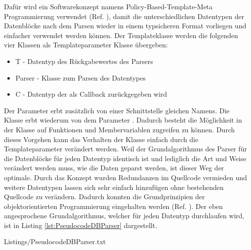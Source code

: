 Daf{\"u}r wird ein Softwarekonzept namens Policy-Based-Template-Meta Programmierung
verwendet (Ref. \cite{Alexandrescu:2001:MCD:377789}), damit die unterschiedlichen Datentypen der Datenbl{\"o}cke nach dem Parsen wieder in einem typsicheren Format vorliegen und
einfacher verwendet werden k{\"o}nnen.
Der Templateklasse werden die folgenden vier Klassen als Templateparameter
Klasse {\"u}bergeben:

\begin{itemize}
\item T - Datentyp des R{\"u}ckgabewertes des Parsers
\item Parser - Klasse zum Parsen des Datentypes
\item C - Datentyp der als Callback zur{\"u}ckgegeben wird
\end{itemize}

Der Parameter  erbt zus{\"a}tzlich von einer
Schnittstelle gleichen Namens. Die Klasse  erbt
wiederum von dem Parameter .
Dadurch besteht die M{\"o}glichkeit in der Klasse auf Funktionen und
Membervariablen zugreifen zu k{\"o}nnen.
Durch dieses Vorgehen kann das Verhalten der Klasse einfach durch die
Templateparameter ver{\"a}ndert werden. Weil der Grundalgorithmus des Parser f{\"u}r
die Datenbl{\"o}cke f{\"u}r jeden Datentyp identisch ist und lediglich die Art und
Weise ver{\"a}ndert werden muss, wie die Daten geparst werden,
ist dieser Weg der optimale. Durch das Konzept wurden
Redundanzen im Quellcode vermieden und weitere Datentypen lassen sich
sehr einfach hinzuf{\"u}gen ohne bestehenden Quellcode zu ver{\"a}ndern. Dadurch konnten
die Grundprinzipien der objektorientierten Programmierung eingehalten werden (Ref. \cite{herold2001go}).
Der eben angesprochene Grundalgorithmus, welcher f{\"u}r jeden Datentyp
durchlaufen wird, ist in Listing \ref{lst:PseudocodeDBParser} dargestellt.

\lstset{language=pseudo}
\lstset{commentstyle=\textit}
{Listings/PseudocodeDBParser.txt}

